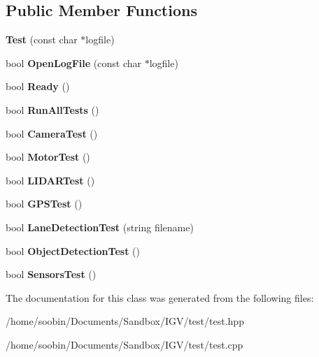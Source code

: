 \subsection*{Public Member Functions}
\begin{DoxyCompactItemize}
\item 
\mbox{\label{classTest_adbe72417514d1a539c5bc6c8babef29b}} 
{\bfseries Test} (const char $\ast$logfile)
\item 
\mbox{\label{classTest_a25598d6dc97057505907cf4c488cbb5e}} 
bool {\bfseries Open\+Log\+File} (const char $\ast$logfile)
\item 
\mbox{\label{classTest_a867b28580579e38b0506e564a3b7d337}} 
bool {\bfseries Ready} ()
\item 
\mbox{\label{classTest_a3b5613b55d133595ac21a4760cc2a858}} 
bool {\bfseries Run\+All\+Tests} ()
\item 
\mbox{\label{classTest_a49c03674efed3ff327fbfc4e73d08b79}} 
bool {\bfseries Camera\+Test} ()
\item 
\mbox{\label{classTest_a77b8ffb69e4073d0fd8eaf95722ff97e}} 
bool {\bfseries Motor\+Test} ()
\item 
\mbox{\label{classTest_afc4a9c7189a8ccd36ad4d3ae6630ef3e}} 
bool {\bfseries L\+I\+D\+A\+R\+Test} ()
\item 
\mbox{\label{classTest_a3e358c24e43706caba09b9fe6c113621}} 
bool {\bfseries G\+P\+S\+Test} ()
\item 
\mbox{\label{classTest_a0fb05792f614566d0e16da82d926f479}} 
bool {\bfseries Lane\+Detection\+Test} (string filename)
\item 
\mbox{\label{classTest_a50f8e04aabd2266d3ee9c86900e85b91}} 
bool {\bfseries Object\+Detection\+Test} ()
\item 
\mbox{\label{classTest_acb268b7a37c9cce085d0659f4747fd4a}} 
bool {\bfseries Sensors\+Test} ()
\end{DoxyCompactItemize}


The documentation for this class was generated from the following files\+:\begin{DoxyCompactItemize}
\item 
/home/soobin/\+Documents/\+Sandbox/\+I\+G\+V/test/test.\+hpp\item 
/home/soobin/\+Documents/\+Sandbox/\+I\+G\+V/test/test.\+cpp\end{DoxyCompactItemize}
